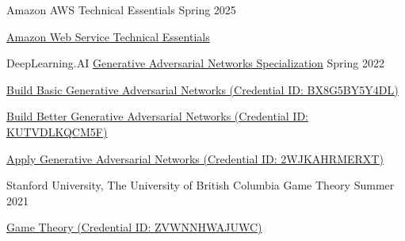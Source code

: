 

\begin{cventries}

  \cventry
    {Amazon} %
    {AWS Technical Essentials} %
    {} %
    {Spring 2025} %
    {
      \begin{cvitems} %
      	\item {\href{https://explore.skillbuilder.aws/learn/courses/1851/aws-technical-essentials}{Amazon Web Service Technical Essentials}}
      \end{cvitems}
    }


  \cventry
    {DeepLearning.AI} %
    {\href{https://www.coursera.org/account/accomplishments/specialization/certificate/WT5VCNDDCB7V}{Generative Adversarial Networks Specialization}} %
    {} %
    {Spring 2022} %
    {
      \begin{cvitems} %
      	\item {\href{https://www.coursera.org/account/accomplishments/certificate/BX8G5BY5Y4DL}{Build Basic Generative Adversarial Networks (Credential ID: BX8G5BY5Y4DL)}}
      	\item {\href{https://www.coursera.org/account/accomplishments/certificate/KUTVDLKQCM5F}{Build Better Generative Adversarial Networks (Credential ID: KUTVDLKQCM5F)}}
      	\item {\href{https://www.coursera.org/account/accomplishments/certificate/2WJKAHRMERXT}{Apply Generative Adversarial Networks (Credential ID: 2WJKAHRMERXT)}}
      \end{cvitems}
    }

  \cventry
    {Stanford University, The University of British Columbia} %
    {Game Theory} %
    {} %
    {Summer 2021} %
    {
      \begin{cvitems} %
      	\item {\href{https://www.coursera.org/account/accomplishments/certificate/ZVWNNHWAJUWC}{Game Theory (Credential ID: ZVWNNHWAJUWC)}}
      \end{cvitems}
    }


\end{cventries}
